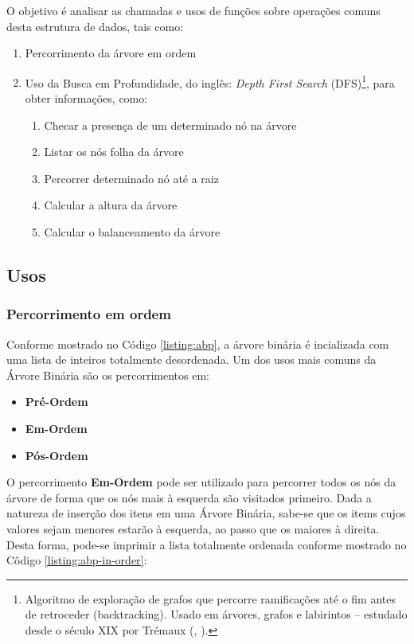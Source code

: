O objetivo é analisar as chamadas e usos de funções sobre operações comuns desta estrutura de dados, tais como:
\vfill\pagebreak
\begin{enumerate}
    \item Percorrimento da árvore em ordem
    \item Uso da Busca em Profundidade, do inglês: \textit{Depth First Search} (DFS)\footnote{
        Algoritmo de exploração de grafos que percorre ramificações até o fim antes de retroceder (backtracking). Usado em árvores, grafos e labirintos – estudado desde o século XIX por Trémaux (\citeauthor{wiki_dfs}, \citeyear{wiki_dfs})\cite{wiki_dfs}.
    }, para obter informações, como:
    \begin{enumerate}
        \item Checar a presença de um determinado nó na árvore
        \item Listar os nós folha da árvore
        \item Percorrer determinado nó até a raiz
        \item Calcular a altura da árvore
        \item Calcular o balanceamento da árvore
    \end{enumerate}
\end{enumerate}

\subsection{Usos}
\subsubsection{Percorrimento em ordem}
Conforme mostrado no Código \ref{listing:abp}, a árvore binária é incializada com uma lista de inteiros totalmente desordenada.
Um dos usos mais comuns da Árvore Binária são os percorrimentos em:
\begin{itemize}
    \item\textbf{Pré-Ordem}
    \item\textbf{Em-Ordem}
    \item\textbf{Pós-Ordem}
\end{itemize}

O percorrimento \textbf{Em-Ordem} pode ser utilizado para percorrer todos os nós da árvore de forma que os nós mais à esquerda são visitados primeiro. Dada a natureza de inserção dos itens em uma Árvore Binária,
sabe-se que os items cujos valores sejam menores estarão à esquerda, ao passo que os maiores à direita. Desta forma, pode-se imprimir a lista totalmente ordenada conforme mostrado no Côdigo \ref{listing:abp-in-order}:

